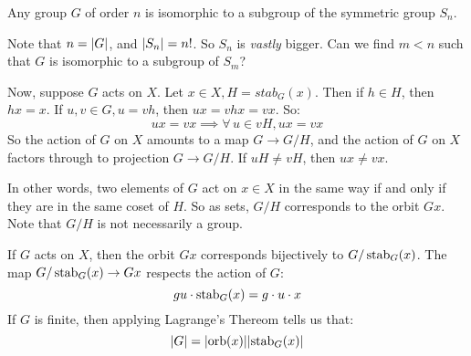 \newpage
\begin{thm}[title=Cayley's Theorem]
    Any group $ G $ of order $ n $ is isomorphic to a subgroup of the symmetric group $ S_{n} $.
\end{thm}

Note that $ n = \abs{G} $, and $ \abs{S_{n}} = n! $.
So $ S_{n} $ is \textit{vastly} bigger.
Can we find $ m < n $ such that $ G $ is isomorphic to a subgroup of $ S_{m} $?

Now, suppose $ G $ acts on $ X $.
Let $ x \in X, H = stab_{G}(x) $.
Then if $ h \in H $, then $ hx = x $.
If $ u, v \in G, u = vh $, then $ ux = vhx = vx $. So:
\begin{equation*}
    ux = vx \implies \forall \, u \in vH, ux = vx
\end{equation*}
So the action of $ G $ on $ X $ amounts to a map $ G \rightarrow G/H $,
and the action of $ G $ on $ X $ factors through to projection $ G \rightarrow G/H $.
If $ uH \neq vH $, then $ ux \neq vx $.

In other words, two elements of $ G $ act on $ x \in X $ in the same way if and only if
they are in the same coset of $ H $.
So as sets, $ G/H $ corresponds to the orbit $ Gx $. Note that $ G/H $ is not necessarily a group.

\begin{thm}[title=Orbit-Stabilizer Theorem]
    If $ G $ acts on $ X $,
    then the orbit $ Gx $ corresponds bijectively to $ G/\operatorname{stab}_{G}(x) $. \vsp
    The map $ G/\operatorname{stab}_{G}(x) \rightarrow Gx $ respects the action of $ G $:
    \begin{equation*}
        gu\cdot\operatorname{stab}_{G}(x) = g \cdot u \cdot x
    \end{equation*}
    If $ G $ is finite, then applying Lagrange's Thereom tells us that:
    \begin{equation*}
        \abs{G} = \abs{\operatorname{orb} (x)}\abs{\operatorname{stab}_{G}(x)}
    \end{equation*}
\end{thm}

